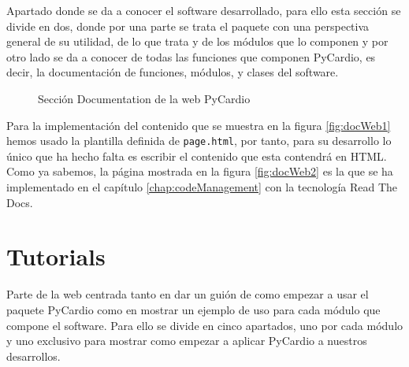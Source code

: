 Apartado donde se da a conocer el software desarrollado, para ello esta sección se divide en dos, donde por una parte se trata el paquete con una perspectiva general de su utilidad, de lo que trata y de los módulos que lo componen y por otro lado se da a conocer de todas las funciones que componen PyCardio, es decir, la documentación de funciones, módulos, y clases del software.

\begin{figure}[h!]
    \centering
    \caption{Sección Documentation de la web PyCardio}
    \label{fig:docWeb}
\end{figure}


Para la implementación del contenido que se muestra en la figura \ref{fig:docWeb1} hemos usado la plantilla definida de \texttt{page.html}, por tanto, para su desarrollo lo único que ha hecho falta es escribir el contenido que esta contendrá en HTML. Como ya sabemos, la página mostrada en la figura \ref{fig:docWeb2} es la que se ha implementado en el capítulo \ref{chap:codeManagement} con la tecnología Read The Docs.
\section{Tutorials}
\label{sec:tutoWeb}

Parte de la web centrada  tanto en dar un guión de como empezar a usar el paquete PyCardio como en mostrar un ejemplo de uso para cada módulo que compone el software. Para ello se divide en cinco apartados, uno por cada módulo y uno exclusivo para mostrar como empezar a aplicar PyCardio a nuestros desarrollos.

